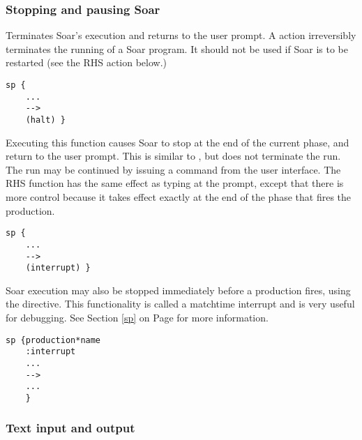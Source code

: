\subsubsection{Stopping and pausing Soar}
\label{RHS-stopping}

\begin{description}
\item [\soarb{halt} ---] Terminates Soar's execution and returns to 
the user prompt.  A  action irreversibly terminates the
running of a Soar program.
It should not be used if Soar is to be restarted (see the
  RHS action below.)
\begin{verbatim}
sp {
    ...
    -->
    (halt) }
\end{verbatim} 

\item [\soarb{interrupt} --- ]
        Executing this function causes Soar to stop at the end of the
        current phase, and return to the user prompt. This is similar 
        to , but does not terminate the run.
        The run may be continued by issuing a  command from
	the user interface.  The  RHS function has the
	same effect as typing  at the prompt, except
	that there is more control because it takes effect exactly
	at the end of the phase that fires the production.
\begin{verbatim}
sp {
    ...
    -->
    (interrupt) }
\end{verbatim}
	
	\label{interrupt-directive}
	Soar execution may also be stopped immediately before a production
	fires, using the  directive. This functionality is
	called a matchtime interrupt and is very useful for debugging. See
	Section	\ref{sp} on Page \pageref{sp} for more information.
	
\begin{verbatim}
sp {production*name
    :interrupt
    ...
    -->
    ...
    }
\end{verbatim}
\end{description}

\subsubsection{Text input and output}

